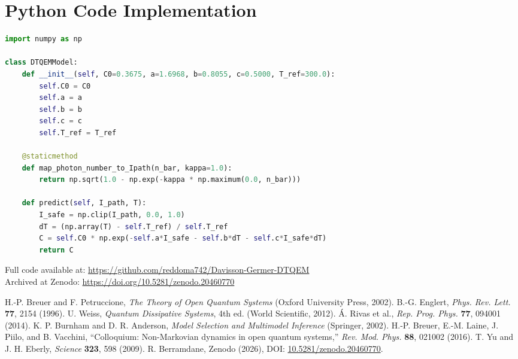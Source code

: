 \documentclass[reprint,amsmath,amssymb,aps,pra,superscriptaddress]{revtex4-2}
\begin{document}
\appendix

\section{Python Code Implementation}

\begin{lstlisting}[language=Python, basicstyle=\ttfamily\small, breaklines=true]
import numpy as np

class DTQEMModel:
    def __init__(self, C0=0.3675, a=1.6968, b=0.8055, c=0.5000, T_ref=300.0):
        self.C0 = C0
        self.a = a
        self.b = b
        self.c = c
        self.T_ref = T_ref

    @staticmethod
    def map_photon_number_to_Ipath(n_bar, kappa=1.0):
        return np.sqrt(1.0 - np.exp(-kappa * np.maximum(0.0, n_bar)))

    def predict(self, I_path, T):
        I_safe = np.clip(I_path, 0.0, 1.0)
        dT = (np.array(T) - self.T_ref) / self.T_ref
        C = self.C0 * np.exp(-self.a*I_safe - self.b*dT - self.c*I_safe*dT)
        return C
\end{lstlisting}

Full code available at: \url{https://github.com/reddoma742/Davisson-Germer-DTQEM} \\
Archived at Zenodo: \url{https://doi.org/10.5281/zenodo.20460770}

\begin{thebibliography}{99}

 H.-P. Breuer and F. Petruccione, \emph{The Theory of Open Quantum Systems} (Oxford University Press, 2002).
 B.-G. Englert, \emph{Phys. Rev. Lett.} \textbf{77}, 2154 (1996).
 U. Weiss, \emph{Quantum Dissipative Systems}, 4th ed. (World Scientific, 2012).
 \'{A}. Rivas et al., \emph{Rep. Prog. Phys.} \textbf{77}, 094001 (2014).
 K. P. Burnham and D. R. Anderson, \emph{Model Selection and Multimodel Inference} (Springer, 2002).
H.-P. Breuer, E.-M. Laine, J. Piilo, and B. Vacchini,
``Colloquium: Non-Markovian dynamics in open quantum systems,''
\textit{Rev. Mod. Phys.} \textbf{88}, 021002 (2016).
 T. Yu and J. H. Eberly, \emph{Science} \textbf{323}, 598 (2009).
 R. Berramdane, Zenodo (2026), DOI: \url{10.5281/zenodo.20460770}.

\end{thebibliography}
\end{document}
